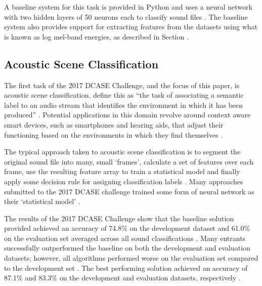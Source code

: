 \documentclass[11pt]{article}
\begin{document}
\begin{multicols}{2}
A baseline system for this task is provided in Python and uses a neural network with two hidden layers of 50 neurons each to classify sound files \cite{Mesaros2017}. The baseline system also provides support for extracting features from the datasets using what is known as log mel-band energies, as described in Section  \cite{Mesaros2017}. 





\subsection{Acoustic Scene Classification}
\label{sec:ASC}

The first task of the 2017 DCASE Challenge, and the focus of this paper, is acoustic scene classification. \citeauthor{Barchiesi2015} define this as ``the task of associating a semantic label to an audio stream that identifies the environment in which it has been produced'' \cite[p.~17]{Barchiesi2015}. Potential applications in this domain revolve around context aware smart devices, such as smartphones and hearing aids, that adjust their functioning based on the environments in which they find themselves \cite{Barchiesi2015}. 

The typical approach taken to acoustic scene classification is to segment the original sound file into many, small `frames', calculate a set of features over each frame, use the resulting feature array to train a statistical model and finally apply some decision rule for assigning classification labels \cite[pp.~18--19]{Barchiesi2015}. Many approaches submitted to the 2017 DCASE challenge trained some form of neural network as their `statistical model' \cite{DCASE2017asc}.

The results of the 2017 DCASE Challenge show that the baseline solution provided achieved an accuracy of 74.8\% on the development dataset and 61.0\% on the evaluation set averaged across all sound classifications \cite{DCASE2017asc}. Many entrants successfully outperformed the baseline on both the development and evaluation datasets; however, all algorithms performed worse on the evaluation set compared to the development set \cite{DCASE2017asc}. The best performing solution achieved an accuracy of 87.1\% and 83.3\% on the development and evaluation datasets, respectively \cite{DCASE2017asc,Mun2017}.







\end{multicols}
\end{document}
